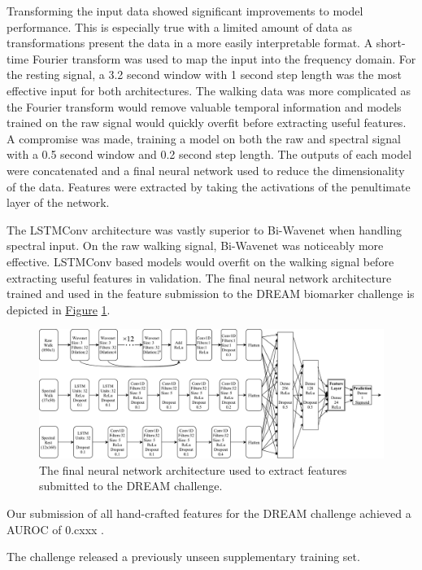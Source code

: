 \documentclass[12pt, twoside]{book}
\begin{document}
Transforming the input data showed significant improvements to model performance. This is especially true with a limited amount of data as transformations present the data in a more easily interpretable format. A short-time Fourier transform was used to map the input into the frequency domain. For the resting signal, a 3.2 second window with 1 second step length was the most effective input for both architectures. The walking data was more complicated as the Fourier transform would remove valuable temporal information and models trained on the raw signal would quickly overfit before extracting useful features. A compromise was made, training a model on both the raw and spectral signal with a 0.5 second window and 0.2 second step length. The outputs of each model were concatenated and a final neural network used to reduce the dimensionality of the data. Features were extracted by taking the activations of the penultimate layer of the network.


The LSTMConv architecture was vastly superior to Bi-Wavenet when handling spectral input. On the raw walking signal, Bi-Wavenet was noticeably more effective. LSTMConv based models would overfit on the walking signal before extracting useful features in validation. The final neural network architecture trained and used in the feature submission to the DREAM biomarker challenge is depicted in \hyperref[finalarchitecture]{Figure} \ref{finalarchitecture}.


\begin{figure}[h]
	\centering\centerline{\includegraphics[width=1.2\linewidth]{final_architecture.pdf}}
	\caption{The final neural network architecture used to extract features submitted to the DREAM challenge.}
	\label{finalarchitecture}
\end{figure}

Our submission of all hand-crafted features for the DREAM challenge achieved a AUROC of 0.cxxx .

The challenge released a previously unseen supplementary training set. 
\end{document}
